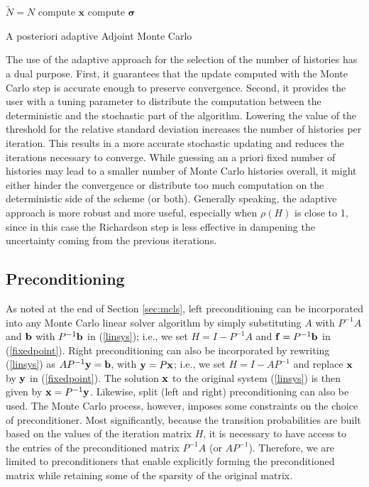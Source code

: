 \documentclass[times]{nlaauth}
\begin{document}
\begin{algorithm}[H]
\LinesNumbered
 $\tilde{N}=N$\;
 compute $\mathbf{x}$\;
 compute $\boldsymbol{\sigma}$\;
 \caption{A posteriori adaptive Adjoint Monte Carlo \label{alg:adaptive_adj}}
\end{algorithm}

The use of the adaptive approach for the selection of the number of histories
has a dual purpose. First, it guarantees that the update computed with the
Monte Carlo step is accurate enough to preserve convergence. Second, it
provides the user with a tuning parameter to distribute the computation
between the deterministic and the stochastic part of the algorithm.
Lowering the value of the threshold for the relative standard deviation
increases the number of histories per iteration. This results in a more accurate
stochastic updating and reduces the iterations necessary to converge.
While guessing an a priori fixed number of histories may lead to
a smaller number of Monte Carlo histories overall, it might either hinder
the convergence or distribute too much computation on the deterministic side
of the scheme (or both).
Generally speaking, the adaptive approach is more robust and more
useful, especially when $\rho(H)$ is close to 1,
since in this case the Richardson step is less effective in dampening the uncertainty
coming from the previous iterations.


\subsection{Preconditioning} \label{sec:prec}

As noted at the end of Section \ref{sec:mcls}, left
preconditioning can be incorporated into any Monte Carlo linear solver
algorithm by simply substituting $A$ with $P^{-1}A$ and
${\bf b}$ with $P^{-1}{\bf b}$ in (\ref{linsys}); i.e.,
we set $H = I - P^{-1}A$
and ${\bf f} = P^{-1}{\bf b}$ in (\ref{fixedpoint}).
Right preconditioning can also be incorporated by rewriting
(\ref{linsys}) as $AP^{-1}{\bf y} = {\bf b}$, with ${\bf y} = P{\bf x}$;
i.e., we set $H=I-AP^{-1}$ and replace $\bf x$ by $\bf y$ in (\ref{fixedpoint}).
The solution $\bf x$ to the original system (\ref{linsys}) is then
given by ${\bf x} = P^{-1}{\bf y}$. Likewise, split (left and right)
preconditioning can also be used. The Monte Carlo process, however,
imposes some constraints on the choice of preconditioner.  Most
significantly, because the transition probabilities are built based on the
values of the iteration matrix $H$, it is necessary to have access to the
entries of the preconditioned matrix $P^{-1}A$ (or $AP^{-1}$).
Therefore, we are limited to preconditioners that enable explicitly
forming the preconditioned matrix while retaining some of the sparsity of the
original matrix.
\end{document}
